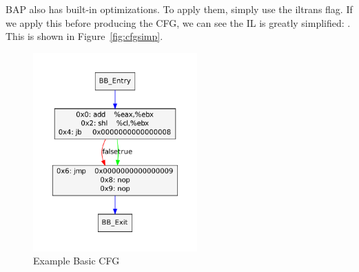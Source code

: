 BAP also has built-in optimizations.  To apply them, simply use the
 iltrans flag.  If we apply this before producing
the CFG, we can see the IL is greatly simplified: . This is shown in
Figure~\ref{fig:cfgsimp}.

\begin{figure}[!p]
  \begin{center}
    \includegraphics[height=3in]{chap-examples/basiccfg.pdf}
  \end{center}
  \caption{Example Basic CFG}
  \label{fig:basiccfg}
\end{figure}

